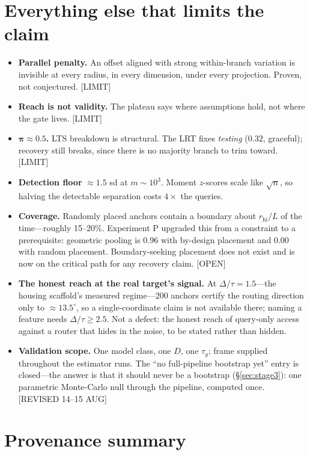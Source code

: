 \documentclass[11pt]{article}
\newcommand{\provtag}[2]{{\footnotesize\sffamily\textcolor{#1}{[#2]}}}
\newcommand{\OPENT}{\provtag{openamber}{OPEN}}
\newcommand{\LIMIT}{\provtag{limred}{LIMIT}}
\newcommand{\REVI}{\provtag{openamber}{REVISED 14--15 AUG}}
\begin{document}
\section{Everything else that limits the claim}
\label{sec:limits}

\begin{itemize}
\item \textbf{Parallel penalty.} An offset aligned with strong within-branch variation is invisible
at every radius, in every dimension, under every projection. Proven, not conjectured. \LIMIT
\item \textbf{Reach is not validity.} The plateau says where assumptions hold, not where the gate
lives. \LIMIT
\item $\bm{\pi \approx 0.5}$\textbf{.} LTS breakdown is structural. The LRT fixes \emph{testing}
($0.32$, graceful); recovery still breaks, since there is no majority branch to trim toward.
\LIMIT
\item \textbf{Detection floor} $\approx 1.5$ sd at $m \sim 10^3$. Moment $z$-scores scale like
$\sqrt{n}$, so halving the detectable separation costs $4\times$ the queries.
\item \textbf{Coverage.} Randomly placed anchors contain a boundary about $r_{\text{hi}}/L$ of the
time---roughly 15--20\%. Experiment P upgraded this from a constraint to a prerequisite:
geometric pooling is $0.96$ with by-design placement and $0.00$ with random placement.
Boundary-seeking placement does not exist and is now on the critical path for any recovery
claim. \OPENT
\item \textbf{The honest reach at the real target's signal.} At $\Delta/\tau = 1.5$---the
housing scaffold's measured regime---$200$ anchors certify the routing direction only to
${\approx}13.5^\circ$, so a single-coordinate claim is not available there; naming a feature
needs $\Delta/\tau \ge 2.5$. Not a defect: the honest reach of query-only access against a
router that hides in the noise, to be stated rather than hidden.
\item \textbf{Validation scope.} One model class, one $D$, one $\tau_y$; frame supplied
throughout the estimator runs. The ``no full-pipeline bootstrap yet'' entry is closed---the
answer is that it should never be a bootstrap (\S\ref{sec:stage3}): one parametric Monte-Carlo
null through the pipeline, computed once. \REVI
\end{itemize}

\section{Provenance summary}
\label{sec:provenance}
\end{document}
